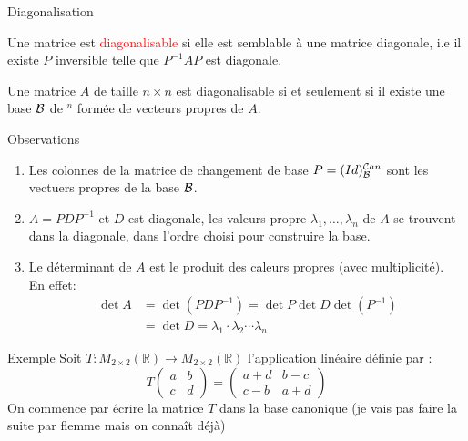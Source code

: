 \begin{parag}{Diagonalisation}
    \begin{definition}
        Une matrice est \textcolor{red}{diagonalisable} si elle est semblable à une matrice diagonale, i.e il existe $P$ inversible telle que $P^{-1}AP$ est diagonale.
    \end{definition}
    \begin{theoreme}
        Une matrice $A$ de taille $n \times n$ est diagonalisable si et seulement si il existe une base $\mathcal{B}$ de \R$^n$ formée de vecteurs propres de $A$.
        \end{theoreme}
        \begin{subparag}{Observations}
            \begin{enumerate}
                \item Les colonnes de la matrice de changement de base $P = (Id)_{\mathcal{B}}^{\mathcal{C} an}$ sont les vectuers propres de la base $\mathcal{B}$.
                \item $A = PDP^{-1}$ et $D$ est diagonale, les valeurs propre $\lambda_1, \dots, \lambda_n$ de $A$ se trouvent dans la diagonale, dans l'ordre choisi pour construire la base.
                \item Le déterminant de $A$ est le produit des caleurs propres (avec multiplicité).\\ En effet:
                \begin{align*}
                    \det A &= \det (PDP^{-1}) = \det P \det D \det (P^{-1})\\
                    &= \det D = \lambda_1\cdot\lambda_2\cdots\lambda_n
                \end{align*}
            \end{enumerate}
        \end{subparag}
        \begin{subparag}{Exemple}
            Soit $T: M_{2\times 2}(\mathbb{R}) \to M_{2 \times 2}(\mathbb{R})$ l'application linéaire définie par : 
            \[T\begin{pmatrix}
                a & b \\ c & d
            \end{pmatrix} = \begin{pmatrix}
                a + d & b - c\\
                c -b & a + d
            \end{pmatrix}\]
            On commence par écrire la matrice $T$ dans la base canonique (je vais pas faire la suite par flemme mais on connaît déjà)
        \end{subparag}
\end{parag}
